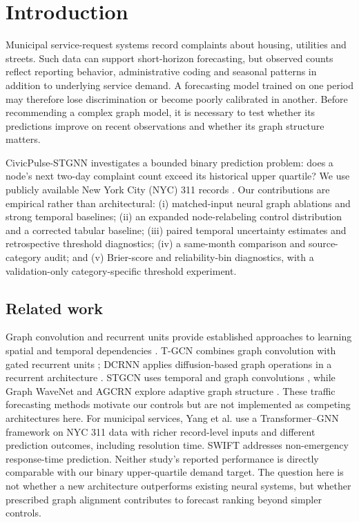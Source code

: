 \documentclass[conference]{IEEEtran}
\begin{document}
\section{Introduction}
Municipal service-request systems record complaints about housing, utilities and streets. Such data can support short-horizon forecasting, but observed counts reflect reporting behavior, administrative coding and seasonal patterns in addition to underlying service demand. A forecasting model trained on one period may therefore lose discrimination or become poorly calibrated in another. Before recommending a complex graph model, it is necessary to test whether its predictions improve on recent observations and whether its graph structure matters.

CivicPulse-STGNN investigates a bounded binary prediction problem: does a node's next two-day complaint count exceed its historical upper quartile? We use publicly available New York City (NYC) 311 records \cite{nyc}. Our contributions are empirical rather than architectural: (i) matched-input neural graph ablations and strong temporal baselines; (ii) an expanded node-relabeling control distribution and a corrected tabular baseline; (iii) paired temporal uncertainty estimates and retrospective threshold diagnostics; (iv) a same-month comparison and source-category audit; and (v) Brier-score and reliability-bin diagnostics, with a validation-only category-specific threshold experiment. 

\subsection{Related work}
Graph convolution and recurrent units provide established approaches to learning spatial and temporal dependencies \cite{kipf,cho}. T-GCN combines graph convolution with gated recurrent units \cite{tgcn}; DCRNN applies diffusion-based graph operations in a recurrent architecture \cite{dcrnn}. STGCN uses temporal and graph convolutions \cite{stgcn}, while Graph WaveNet and AGCRN explore adaptive graph structure \cite{wave,agcrn}. These traffic forecasting methods motivate our controls but are not implemented as competing architectures here. For municipal services, Yang et al. \cite{yang} use a Transformer--GNN framework on NYC 311 data with richer record-level inputs and different prediction outcomes, including resolution time. SWIFT \cite{swift} addresses non-emergency response-time prediction. Neither study's reported performance is directly comparable with our binary upper-quartile demand target. The question here is not whether a new architecture outperforms existing neural systems, but whether prescribed graph alignment contributes to forecast ranking beyond simpler controls.
\end{document}
